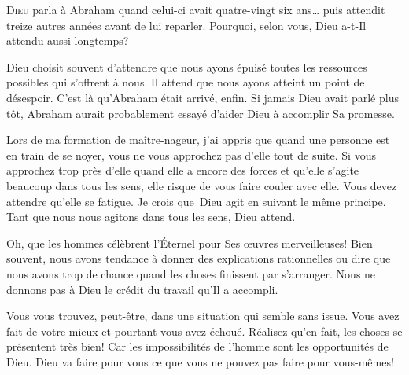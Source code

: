 \dvrule








\lettrine{D}{ieu} parla à Abraham quand celui-ci avait quatre-vingt
 six ans\dots{} puis attendit treize autres années avant de lui reparler.
 Pourquoi, selon vous, Dieu a-t-Il attendu aussi longtemps? 

Dieu choisit souvent d'attendre que nous ayons épuisé toutes les ressources
 possibles qui s'offrent à nous.
 Il attend que nous ayons atteint un point de désespoir.
 C'est là qu'Abraham était arrivé, enfin.
 Si jamais Dieu avait parlé plus tôt, Abraham aurait probablement essayé
 d'aider Dieu à accomplir Sa promesse. 

Lors de ma formation de maître-nageur, j'ai appris que quand une personne
 est en train de se noyer, vous ne vous approchez pas d'elle tout de suite.
 Si vous approchez trop près d'elle quand elle a encore des forces
 et qu'elle s'agite beaucoup dans tous les sens,
 elle risque de vous faire couler avec elle.
 Vous devez attendre qu'elle se fatigue.
 Je crois que~Dieu agit en suivant le même principe.
 Tant que nous nous agitons dans tous les sens, Dieu attend. 


\Og Oh, que les hommes célèbrent l'Éternel pour
 Ses \oe{}uvres merveilleuses! \Fg{}
 Bien souvent, nous avons tendance à donner des explications rationnelles
 ou dire que nous avons trop de chance quand les choses finissent
 par s'arranger.
 Nous ne donnons pas à Dieu le crédit du travail qu'Il a accompli. 

Vous vous trouvez, peut-être, dans une situation qui semble sans issue.
 Vous avez fait de votre mieux et pourtant vous avez échoué.
 Réalisez qu'en fait, les choses se présentent très bien!
 Car les impossibilités de l'homme sont les opportunités de Dieu.
 Dieu va faire pour vous ce que vous ne pouvez pas faire pour vous-mêmes! 

